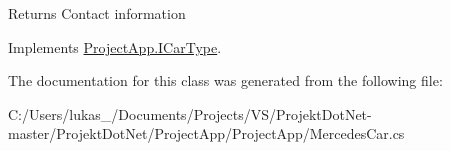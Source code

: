 \begin{DoxyReturn}{Returns}
Contact information
\end{DoxyReturn}


Implements \mbox{\hyperlink{interface_project_app_1_1_i_car_type}{Project\+App.\+I\+Car\+Type}}.



The documentation for this class was generated from the following file\+:\begin{DoxyCompactItemize}
\item 
C\+:/\+Users/lukas\+\_/\+Documents/\+Projects/\+V\+S/\+Projekt\+Dot\+Net-\/master/\+Projekt\+Dot\+Net/\+Project\+App/\+Project\+App/Mercedes\+Car.\+cs\end{DoxyCompactItemize}
